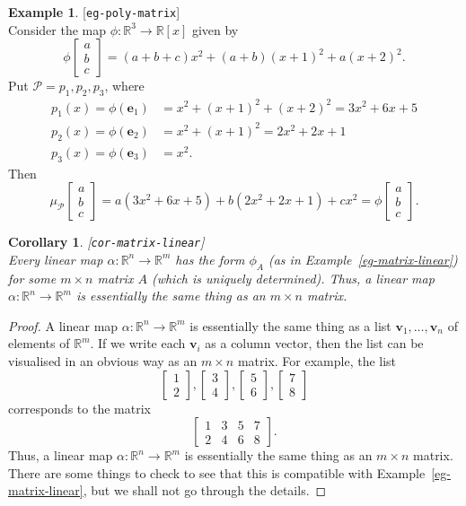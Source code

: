 \documentclass{amsart}
\newcommand{\lbl}[1]{\label{#1}\textup{[\texttt{#1}]}\ \\}
\newcommand{\lbl}{\label}
\newcommand{\R}         {{\mathbb{R}}}
\newcommand{\bsm}       {\left[\begin{smallmatrix}}
\newcommand{\esm}       {\end{smallmatrix}\right]}
\newcommand{\al}        {\alpha}
\newcommand{\tm}        {\times}
\newcommand{\xra}       {\xrightarrow}
\newcommand{\ve}        {\mathbf{e}}
\newcommand{\vv}        {\mathbf{v}}
\newcommand{\CP}        {{\mathcal{P}}}
\renewcommand{\:}       {\colon}
\newtheorem{corollary}[theorem]{Corollary}
\theoremstyle{definition}
\newtheorem{example}[theorem]{Example}
\begin{document}
\begin{example}\lbl{eg-poly-matrix}
 {Consider the map $\phi\:\R^3\to\R[x]$ given by 
 \[ \phi\bsm a\\ b\\ c\esm = 
     (a+b+c) x^2 + (a+b)(x+1)^2 + a (x+2)^2.
 \]}
 {Put $\CP=p_1,p_2,p_3$, where 
 \begin{align*}
  {p_1(x) = \phi(\ve_1)} &{= x^2+(x+1)^2+(x+2)^2 = 3x^2+6x+5} \\
  {p_2(x) = \phi(\ve_2)} &{= x^2+(x+1)^2 = 2x^2+2x+1} \\
  {p_3(x) = \phi(\ve_3)} &{= x^2.}
 \end{align*}}
 {Then 
 \[ \mu_\CP\bsm a\\ b\\ c\esm = 
     a (3x^2+6x+5) + b(2x^2 + 2x + 1) + cx^2{= 
    \phi\bsm a\\ b\\ c\esm.}
 \]}
\end{example}

\begin{corollary}\lbl{cor-matrix-linear}
 Every linear map $\al\:\R^n\xra{}\R^m$ has the form
 $\phi_A$ (as in Example~\ref{eg-matrix-linear}) for some
 $m\tm n$ matrix $A$ (which is uniquely determined).  Thus,
 a linear map $\al\:\R^n\xra{}\R^m$ is essentially the same
 thing as an $m\tm n$ matrix.
\end{corollary}
\begin{proof}
 A linear map $\al\:\R^n\xra{}\R^m$ is essentially the same
 thing as a list $\vv_1,\ldots,\vv_n$ of elements of $\R^m$.
 If we write each $\vv_i$ as a column vector, then the list
 can be visualised in an obvious way as an $m\tm n$ matrix.
 For example, the list
 \[ \bsm 1 \\ 2 \esm , \bsm 3\\4\esm , 
    \bsm 5 \\ 6 \esm , \bsm 7\\8\esm 
 \]
 corresponds to the matrix
 \[ \bsm 1 & 3 & 5 & 7 \\ 2 & 4 & 6 & 8 \esm. \]
 Thus, a linear map $\al\:\R^n\xra{}\R^m$ is essentially the
 same thing as an $m\tm n$ matrix.  There are some things to
 check to see that this is compatible with
 Example~\ref{eg-matrix-linear}, but we shall not go through
 the details.
\end{proof}
\end{document}
